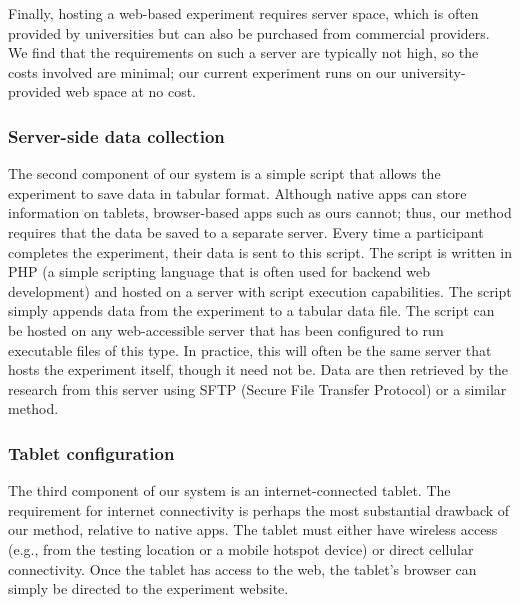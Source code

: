 \documentclass[man,noapacite]{apa2}
\begin{document}
Finally, hosting a web-based experiment requires server space, which is often provided by universities but can also be purchased from commercial providers. We find that the requirements on such a server are typically not high, so the costs involved are minimal; our current experiment runs on our university-provided web space at no cost.


\subsubsection{Server-side data collection}

The second component of our system is a simple script that allows the experiment to save data in tabular format. Although native apps can store information on tablets, browser-based apps such as ours cannot; thus, our method requires that the data be saved to a separate server. Every time a participant completes the experiment, their data is sent to this script. The script is written in PHP (a simple scripting language that is often used for backend web development) and hosted on a server with script execution capabilities. The script simply appends data from the experiment to a tabular data file. The script can be hosted on any web-accessible server that has been configured to run executable files of this type. In practice, this will often be the same server that hosts the experiment itself, though it need not be. Data are then retrieved by the research from this server using SFTP (Secure File Transfer Protocol) or a similar method. 

\subsubsection{Tablet configuration}

The third component of our system is an internet-connected tablet. The requirement for internet connectivity is perhaps the most substantial drawback of our method, relative to native apps. The tablet must either have wireless access (e.g., from the testing location or a mobile hotspot device) or direct cellular connectivity. Once the tablet has access to the web, the tablet's browser can simply be directed to the experiment website. 
\end{document}
